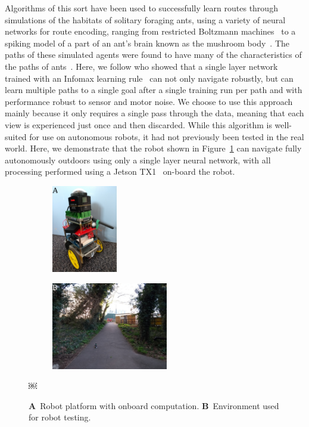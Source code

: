 \documentclass[letterpaper]{article}
\begin{document}
Algorithms of this sort have been used to successfully learn routes through simulations of the habitats of solitary foraging ants, using a variety of neural networks for route encoding, ranging from restricted Boltzmann machines~\citep{Baddeley2011models} to a spiking model of a part of an ant's brain known as the mushroom body~\citep{Ardin2016}.
The paths of these simulated agents were found to have many of the characteristics of the paths of ants~\citep{Wystrach2013}.
Here, we follow \citet{Baddeley2012} who showed that a single layer network trained with an Infomax learning rule~\citep{Bell1995} can not only navigate robustly, but can learn multiple paths to a single goal after a single training run per path and with performance robust to sensor and motor noise.
We choose to use this approach mainly because it only requires a single pass through the data, meaning that each view is experienced just once and then discarded.
While this algorithm is well-suited for use on autonomous robots, it had not previously been tested in the real world.
Here, we demonstrate that the robot shown in Figure~\ref{fig:robot} can navigate fully autonomously outdoors using only a single layer neural network, with all processing performed using a Jetson TX1~\citep{NVIDIACorporation2016} on-board the robot.

\begin{figure}[t]
    \centering
    \begin{subfigure}[b]{0.35\columnwidth}
        \includegraphics[height=1.5in]{figures/robot.jpg}
    \end{subfigure}
    \begin{subfigure}[b]{0.63\columnwidth}
        \includegraphics[height=1.5in]{figures/robot_environment.jpg}
    \end{subfigure}
    \caption{\textbf{A}~Robot platform with onboard computation.
    \textbf{B}~Environment used for robot testing.}￼
    \label{fig:robot}
\end{figure}
\end{document}
